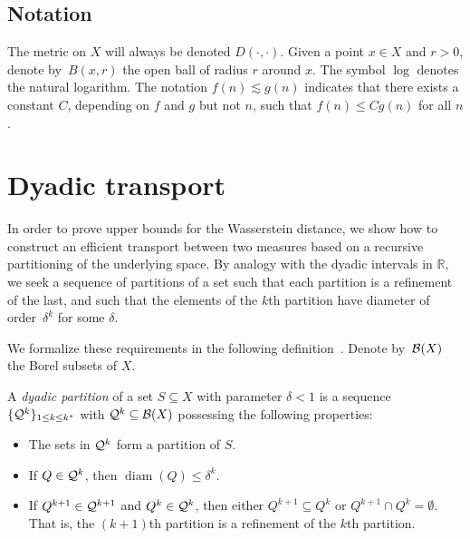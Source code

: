 \documentclass[sts]{imsart}
\newcommand{\RR}{\mathbb{R}}
\DeclareMathOperator{\diam}{diam}
\begin{document}
\subsection{Notation}
The metric on $X$ will always be denoted $D(\cdot, \cdot)$.
Given a point $x \in X$ and $r > 0$, denote by~$B(x, r)$ the open ball of radius $r$ around $x$.
The symbol $\log$ denotes the natural logarithm.
The notation $f(n) \lesssim g(n)$ indicates that there exists a constant $C$, depending on $f$ and $g$ but not $n$, such that $f(n) \leq C g(n)$ for all $n$.

\section{Dyadic transport}\label{sec:dyadic}
In order to prove upper bounds for the Wasserstein distance, we show how to construct an efficient transport between two measures based on a recursive partitioning of the underlying space.
By analogy with the dyadic intervals in $\RR$, we seek a sequence of partitions of a set such that each partition is a refinement of the last, and such that the elements of the $k$th partition have diameter of order~$\delta^k$ for some $\delta$.

We formalize these requirements in the following definition~\cite[Section~A]{Dav88}.
Denote by~$\mathcal{B}(X)$ the Borel subsets of $X$.
\begin{definition}\label{def:dyadic}
A \emph{dyadic partition} of a set $S \subseteq X$ with parameter $\delta < 1$ is a sequence~$\{\mathcal{Q}^k\}_{1 \leq k \leq k^*}$ with $\mathcal{Q}^k \subseteq \mathcal{B}(X)$ possessing the following properties:
\begin{itemize}
\item The sets in $\mathcal{Q}^k$ form a partition of $S$.
\item If $Q \in \mathcal{Q}^k$, then $\diam(Q) \leq \delta^k$.
\item If $Q^{k+1} \in \mathcal{Q}^{k+1}$ and $Q^k \in \mathcal{Q}^k$, then either $Q^{k+1} \subseteq Q^k$ or $Q^{k+1} \cap Q^k = \emptyset$. That is, the $(k+1)$th partition is a refinement of the $k$th partition.
\end{itemize}
\end{definition}
\end{document}
